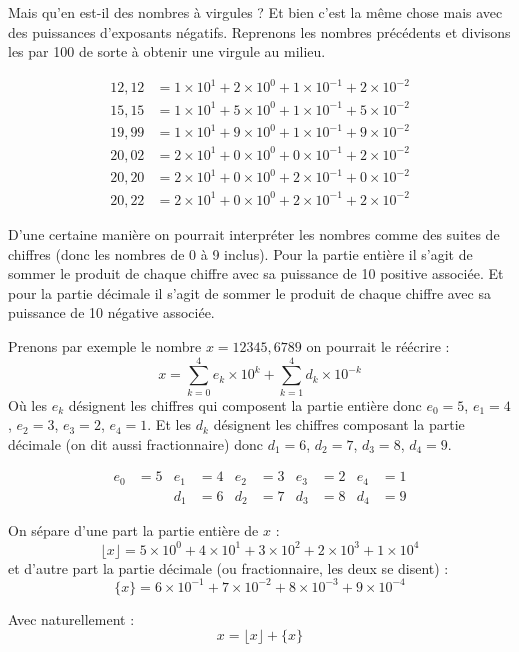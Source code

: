 \documentclass[a4paper, 11pt, twoside]{book}
\begin{document}
Mais qu'en est-il des nombres à virgules ? Et bien c'est la même
chose mais avec des puissances d'exposants négatifs. Reprenons les
nombres précédents et divisons les par 100 de sorte à obtenir une
virgule au milieu.

\begin{align*}
12,12 &= 1\times 10^1 + 2\times 10^0 + 1\times 10^{-1} + 2\times 10^{-2}\\
15,15 &= 1\times 10^1 + 5\times 10^0 + 1\times 10^{-1} + 5\times 10^{-2}\\
19,99 &= 1\times 10^1 + 9\times 10^0 + 1\times 10^{-1} + 9\times 10^{-2}\\
20,02 &= 2\times 10^1 + 0\times 10^0 + 0\times 10^{-1} + 2\times 10^{-2}\\
20,20 &= 2\times 10^1 + 0\times 10^0 + 2\times 10^{-1} + 0\times 10^{-2}\\
20,22 &= 2\times 10^1 + 0\times 10^0 + 2\times 10^{-1} + 2\times 10^{-2}
\end{align*}

D'une certaine manière on pourrait interpréter les nombres comme
des suites de chiffres (donc les nombres de 0 à 9 inclus). Pour la
partie entière il s'agit de sommer le produit de chaque chiffre
avec sa puissance de 10 positive associée. Et pour la partie
décimale il s'agit de sommer le produit de chaque chiffre avec sa
puissance de 10 négative associée.

Prenons par exemple le nombre \(x = 12345,6789\) on pourrait le
réécrire : \[x = \sum_{k = 0}^4e_k\times 10^k + \sum_{k =
    1}^4d_k\times 10^{-k}\]
Où les \(e_k\) désignent les chiffres qui composent la partie
entière donc \(e_0 = 5\), \(e_1 = 4\), \(e_2 = 3\), \(e_3 = 2\), \(e_4 =
    1\). Et les \(d_k\) désignent les chiffres composant la partie
décimale (on dit aussi fractionnaire) donc \(d_1 = 6\), \(d_2 = 7\),
\(d_3 = 8\), \(d_4 = 9\).

\begin{align*}
e_0 &= 5 & e_1 &= 4 & e_2 &= 3 & e_3 &= 2 & e_4 &= 1\\
    &    & d_1 &= 6 & d_2 &= 7 & d_3 &= 8 & d_4 &= 9
\end{align*}

On sépare d'une part la partie entière de \(x\) :
\[\lfloor x \rfloor = 5\times 10^0 + 4\times 10^1 + 3\times 10^2 + 2\times 10^3 +
    1\times 10^4\]
et d'autre part la partie décimale (ou fractionnaire, les deux se
disent) :
\[\{ x \} = 6\times 10^{-1} + 7\times 10^{-2} + 8\times 10^{-3} +
    9\times 10^{-4}\]

Avec naturellement :
\[x = \lfloor x \rfloor + \{ x \}\]
\end{document}
